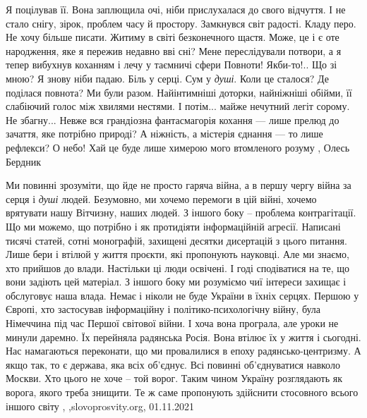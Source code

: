 Я поцілував її. Вона заплющила очі, ніби прислухалася до свого відчуття. І не
стало снігу, зірок, проблем часу й простору. Замкнувся світ радості.  Кладу
перо. Не хочу більше писати. Житиму в світі безконечного щастя. Може, це і є
оте народження, яке я пережив недавно вві сні? Мене переслідували потвори, а я
тепер вибухнув коханням і лечу у таємничі сфери Повноти! Якби-то!..  Що зі
мною? Я знову ніби падаю. Біль у серці. Сум у \emph{душі}. Коли це сталося? Де
поділася повнота?  Ми були разом. Найінтимніші доторки, найніжніші обійми, її
слабіючий голос між хвилями нестями. І потім... майже нечутний легіт сорому. Не
збагну...  Невже вся грандіозна фантасмагорія кохання — лише прелюд до зачаття,
яке потрібно природі? А ніжність, а містерія єднання — то лише рефлекси? О
небо!  Хай це буде лише химерою мого втомленого розуму
, Олесь Бердник

Ми повинні зрозуміти, що йде не просто гаряча війна, а в першу чергу війна за
серця і \emph{душі} людей. Безумовно, ми хочемо перемоги в цій війні, хочемо врятувати
нашу Вітчизну, наших людей.  З іншого боку – проблема контрагітації. Що ми
можемо, що потрібно і як протидіяти інформаційній агресії. Написані тисячі
статей, сотні монографій, захищені десятки дисертацій з цього питання. Лише
бери і втілюй у життя проєкти, які пропонують науковці.  Але ми знаємо, хто
прийшов до влади. Настільки ці люди освічені. І годі сподіватися на те, що вони
задіють цей матеріал. З іншого боку ми розуміємо чиї інтереси захищає і
обслуговує наша влада. Немає і ніколи не буде України в їхніх серцях.  Першою у
Європі, хто застосував інформаційну і політико-психологічну війну, була
Німеччина під час Першої світової війни. І хоча вона програла, але уроки не
минули даремно. Їх перейняла радянська Росія. Вона втілює їх у життя і
сьогодні. Нас намагаються переконати, що ми провалилися в епоху
радянсько-центризму. А якщо так, то є держава, яка всіх об’єднує. Всі повинні
об’єднуватися навколо Москви. Хто цього не хоче – той ворог. Таким чином
Україну розглядають як ворога, якого треба знищити. Те ж саме пропонують
здійснити стосовного всього іншого світу
, ,slovoprosvity.org, 01.11.2021

